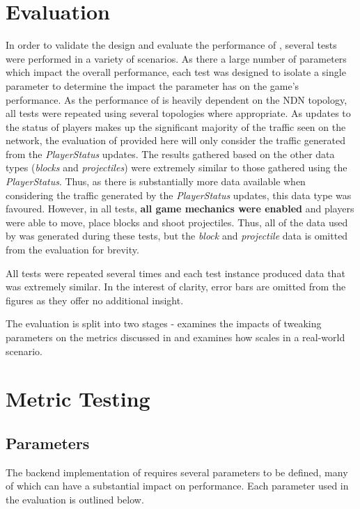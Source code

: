 \section{Evaluation}\label{sec:eval}
In order to validate the design and evaluate the performance of \game{}, several tests were performed in a variety of scenarios. As there a large number of parameters which impact the overall performance, each test was designed to isolate a single parameter to determine the impact the parameter has on the game's performance. As the performance of \game{} is heavily dependent on the NDN topology, all tests were repeated using several topologies where appropriate. As updates to the status of players makes up the significant majority of the traffic seen on the network, the evaluation of \game{} provided here will only consider the traffic generated from the \textit{PlayerStatus} updates. The results gathered based on the other data types (\textit{blocks} and \textit{projectiles}) were extremely similar to those gathered using the \textit{PlayerStatus}. Thus, as there is substantially more data available when considering the traffic generated by the \textit{PlayerStatus} updates, this data type was favoured. However, in all tests, \textbf{all game mechanics were enabled} and players were able to move, place blocks and shoot projectiles. Thus, all of the data used by \game{} was generated during these tests, but the \textit{block} and \textit{projectile} data is omitted from the evaluation for brevity.  

All tests were repeated several times and each test instance produced data that was extremely similar. In the interest of clarity, error bars are omitted from the figures as they offer no additional insight.

The evaluation is split into two stages -  examines the impacts of tweaking parameters on the metrics discussed in  and  examines how \game{} scales in a real-world scenario.


\section{Metric Testing}\label{sec:eval:metrics-testing}

\subsection{Parameters}
The backend implementation of \game{} requires several parameters to be defined, many of which can have a substantial impact on performance. Each parameter used in the evaluation is outlined below.

